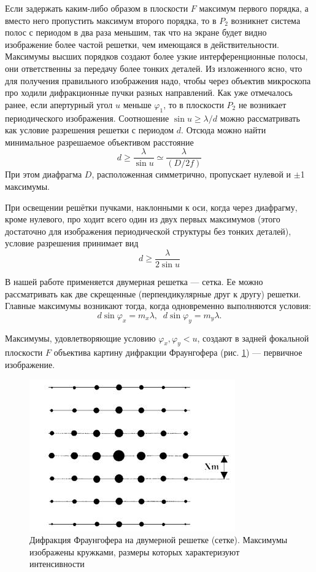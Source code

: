\documentclass[12pt]{article}
\renewcommand{\geq}{\ensuremath{\geqslant}}
\begin{document}
	
	Если задержать каким-либо образом в плоскости
	$F$ максимум первого порядка, а вместо него пропустить максимум второго порядка, то
	в $P_2$ возникнет система полос с периодом в два раза меньшим, так что на экране будет видно изображение более частой решетки, чем имеющаяся в действительности. Максимумы высших порядков создают более узкие интерференционные полосы, они ответственны за передачу более
	тонких деталей. Из изложенного ясно, что для получения правильного изображения
	надо, чтобы через объектив микроскопа про
	ходили дифракционные пучки разных направлений. Как уже отмечалось ранее, если апертурный
	угол $u$ меньше
	$\varphi_1$, то в плоскости
	$P_2$ не возникает периодического изображения. Соотношение $\sin u \geqslant \lambda/d$ можно рассматривать	как
	условие разрешения решетки с периодом
	$d$.
	Отсюда можно найти минимальное разрешаемое объективом расстояние
	\begin{equation}\label{eq::min_dist}
	d \geq \dfrac{\lambda}{\sin u} \simeq \dfrac{\lambda}{(D/2f)}
	\end{equation}
	При этом диафрагма $D$, расположенная симметрично, пропускает нулевой и
	$\pm$1 максимумы.
	
	При освещении решётки пучками, наклонными
	к оси,
	когда через
	диафрагму, кроме нулевого, про
	ходит всего один из двух первых максимумов (этого достаточно для изображения периодической структуры
	без тонких деталей),
	условие разрешения принимает вид
	$$d \geq \dfrac{\lambda}{2\sin u}$$
	
	В нашей работе применяется двумерная решетка
	— сетка. Ее можно рассматривать
	как две скрещенные (перпендикулярные друг к другу) решетки.
	Главные максимумы возникают тогда,
	когда одновременно выполняются
	условия:
	$$d\sin \varphi_x = m_x\lambda, \; \; d\sin \varphi_y = m_y\lambda.$$
	
	Максимумы, удовлетворяющие
	условию $\varphi_x, \varphi_y <
	u$, создают в задней
	фокальной плоскости
	$F$ объектива
	картину дифракции Фраунгофера (рис. \ref{fig::frau}) 
	— первичное изображение.
	
	\begin{figure}
		\includegraphics{3}
		\caption{Дифракция Фраунгофера на двумерной решетке
			(сетке). Максимумы изображены кружками, размеры которых характеризуют интенсивности}
		\label{fig::frau}
	\end{figure}
\end{document}
